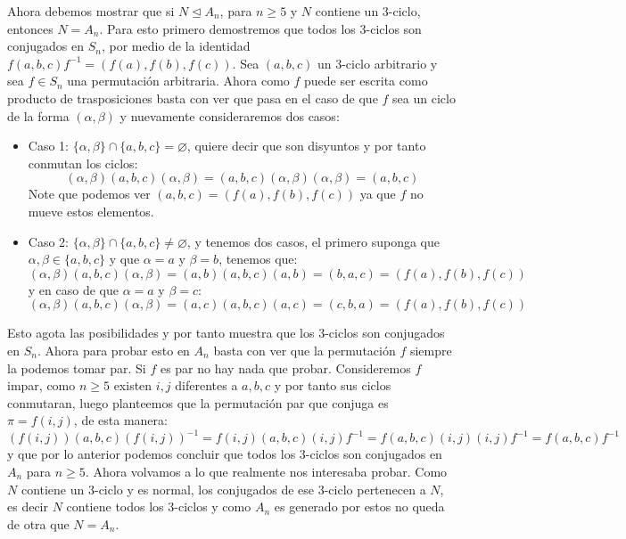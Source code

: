 \begin{homeworkProblem}
\begin{solucion}
        Ahora debemos mostrar que si $N\trianglelefteq A_n$, para $n\geq 5$ y $N$ contiene un 3-ciclo, entonces $N=A_n$. Para esto primero demostremos que todos los 3-ciclos son conjugados en $S_n$, por medio de la identidad $f(a,b,c)f^{-1}=(f(a),f(b),f(c))$. Sea $(a,b,c)$ un 3-ciclo arbitrario y sea $f\in S_n$ una permutación arbitraria. Ahora como $f$ puede ser escrita como producto de trasposiciones basta con ver que pasa en el caso de que $f$ sea un ciclo de la forma $(\alpha,\beta)$ y nuevamente consideraremos dos casos:
        \begin{itemize}
            \item Caso 1: $\{\alpha,\beta\}\cap\{a,b,c\}=\varnothing$, quiere decir que son disyuntos y por tanto conmutan los ciclos:
            $$(\alpha,\beta)(a,b,c)(\alpha,\beta)=(a,b,c)(\alpha,\beta)(\alpha,\beta)=(a,b,c)$$
            Note que podemos ver $(a,b,c)=(f(a),f(b),f(c))$ ya que $f$ no mueve estos elementos.
            \item Caso 2: $\{\alpha,\beta\}\cap\{a,b,c\}\neq\varnothing$, y tenemos dos casos, el primero suponga que $\alpha,\beta\in\{a,b,c\}$ y que $\alpha=a$ y $\beta=b$, tenemos que:
            $$(\alpha,\beta)(a,b,c)(\alpha,\beta)=(a,b)(a,b,c)(a,b)=(b,a,c)=(f(a),f(b),f(c))$$ y en caso de que $\alpha=a$ y $\beta=c$:
            $$(\alpha,\beta)(a,b,c)(\alpha,\beta)=(a,c)(a,b,c)(a,c)=(c,b,a)=(f(a),f(b),f(c))$$
        \end{itemize}
        Esto agota las posibilidades y por tanto muestra que los 3-ciclos son conjugados en $S_n$. Ahora para probar esto en $A_n$ basta con ver que la permutación $f$ siempre la podemos tomar par. Si $f$ es par no hay nada que probar. Consideremos $f$ impar, como $n\geq 5$ existen $i,j$ diferentes a $a,b,c$ y por tanto sus ciclos conmutaran, luego planteemos que la permutación par que conjuga es $\pi=f(i,j)$, de esta manera:
            $$(f(i,j))(a,b,c)(f(i,j))^{-1}=f(i,j)(a,b,c)(i,j)f^{-1}=f(a,b,c)(i,j)(i,j)f^{-1}=f(a,b,c)f^{-1}$$
            y que por lo anterior podemos concluir que todos los 3-ciclos son conjugados en $A_n$ para $n\geq 5$.
            Ahora volvamos a lo que realmente nos interesaba probar. Como $N$ contiene un 3-ciclo y es normal, los conjugados de ese 3-ciclo pertenecen a $N$, es decir $N$ contiene todos los 3-ciclos y como $A_n$ es generado por estos no queda de otra que $N=A_n$.\\


\end{solucion}
\end{homeworkProblem}
